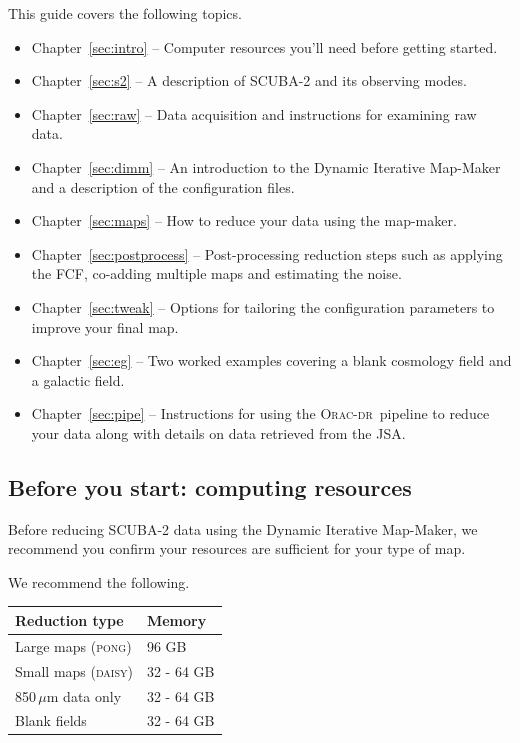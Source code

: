 \documentclass[twoside,11pt]{article}
\newcommand{\htmladdnormallink}[2]{#1}
\newcommand{\htmlref}[2]{#1}
\newcommand{\latexhtml}[2]{#1}
\newcommand{\xlabel}[1]{}
\renewcommand{\_}{\texttt{\symbol{95}}}
\newcommand{\oracdr}{\htmladdnormallink{\textsc{Orac-dr}}{http://www.oracdr.org/oracdr}}
\newcommand{\cref}[3]{\latexhtml{#1~\ref{#2}}{\htmlref{#3}{#2}}}
\begin{document}
This guide covers the following topics.
\begin{itemize}
\itemsep0em
\item \cref{Chapter}{sec:intro}{Chapter 1} -- Computer resources you'll need before getting started.
\item \cref{Chapter}{sec:s2}{Chapter 2} -- A description of SCUBA-2 and its observing modes.
\item \cref{Chapter}{sec:raw}{Chapter 3}  -- Data acquisition and instructions for examining raw data.
\item \cref{Chapter}{sec:dimm}{Chapter 4}  -- An introduction to the Dynamic Iterative Map-Maker and a description of the configuration files.
\item \cref{Chapter}{sec:maps}{Chapter 5}  -- How to reduce your data using the map-maker.
\item \cref{Chapter}{sec:postprocess}{Chapter 6}  -- Post-processing reduction steps such as applying the FCF, co-adding multiple maps and estimating the noise.
\item \cref{Chapter}{sec:tweak}{Chapter 7}  -- Options for tailoring the configuration parameters to improve your final map.
\item \cref{Chapter}{sec:eg}{Chapter 8}  -- Two worked examples covering a \htmlref{blank cosmology field}{sec:cosmology} and a \htmlref{galactic field}{sec:bright_ex}.
\item \cref{Chapter}{sec:pipe}{Chapter 9}  -- Instructions for using the \oracdr\ pipeline to reduce your data along with details on data retrieved from the JSA.
\end{itemize}

\subsection{\xlabel{computing}Before you start: computing resources}

Before reducing SCUBA-2 data using the Dynamic Iterative Map-Maker, we
recommend you confirm your resources are sufficient for your type of
map.

We recommend the following.\\
\begin{table}[h!]
\centering
\begin{tabular}{ll}
\hline
\textbf{Reduction type} &\textbf{Memory} \\
\hline
Large maps (\textsc{pong})& 96 GB\\
Small maps (\textsc{daisy})&32 - 64 GB\\
850\,$\mu$m data only&32 - 64 GB\\
Blank fields&32 - 64 GB\\
\hline
\end{tabular}
\end{table}
\end{document}
